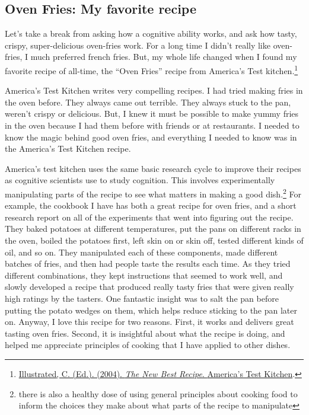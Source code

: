 \documentclass[
  oneside,
  12pt]{crumpbook}
\begin{document}
\hypertarget{oven-fries-my-favorite-recipe}{%
\subsection{Oven Fries: My favorite recipe}\label{oven-fries-my-favorite-recipe}}

Let's take a break from asking how a cognitive ability works, and ask how tasty, crispy, super-delicious oven-fries work. For a long time I didn't really like oven-fries, I much preferred french fries. But, my whole life changed when I found my favorite recipe of all-time, the ``Oven Fries'' recipe from America's Test kitchen.\footnote{\protect\hyperlink{ref-illustratedNewBestRecipe2004}{Illustrated, C. (Ed.). (2004). \emph{The {New Best Recipe}}. {America's Test Kitchen}}.}

America's Test Kitchen writes very compelling recipes. I had tried making fries in the oven before. They always came out terrible. They always stuck to the pan, weren't crispy or delicious. But, I knew it must be possible to make yummy fries in the oven because I had them before with friends or at restaurants. I needed to know the magic behind good oven fries, and everything I needed to know was in the America's Test Kitchen recipe.

America's test kitchen uses the same basic research cycle to improve their recipes as cognitive scientists use to study cognition. This involves experimentally manipulating parts of the recipe to see what matters in making a good dish.\footnote{there is also a healthy dose of using general principles about cooking food to inform the choices they make about what parts of the recipe to manipulate} For example, the cookbook I have has both a great recipe for oven fries, and a short research report on all of the experiments that went into figuring out the recipe. They baked potatoes at different temperatures, put the pans on different racks in the oven, boiled the potatoes first, left skin on or skin off, tested different kinds of oil, and so on. They manipulated each of these components, made different batches of fries, and then had people taste the results each time. As they tried different combinations, they kept instructions that seemed to work well, and slowly developed a recipe that produced really tasty fries that were given really high ratings by the tasters. One fantastic insight was to salt the pan before putting the potato wedges on them, which helps reduce sticking to the pan later on. Anyway, I love this recipe for two reasons. First, it works and delivers great tasting oven fries. Second, it is insightful about what the recipe is doing, and helped me appreciate principles of cooking that I have applied to other dishes.
\end{document}
